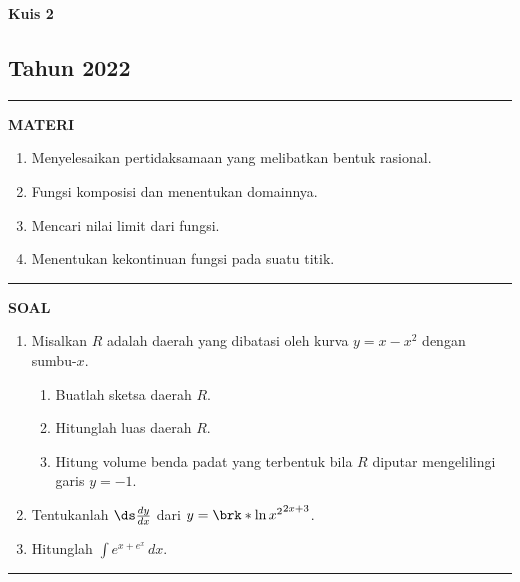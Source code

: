 \begin{flushright}
    \textbf{\Large{Kuis 2}}
    \subsection*{Tahun 2022}
\end{flushright}
\vspace{0.5cm}
\hrule height 2pt
\vspace{0.5cm}
\begin{center}
    \textbf{\large{MATERI}}
    \begin{enumerate}[leftmargin=*, label={\arabic*}.]
        \item Menyelesaikan pertidaksamaan yang melibatkan bentuk rasional.
        \item Fungsi komposisi dan menentukan domainnya.
        \item Mencari nilai limit dari fungsi.
        \item Menentukan kekontinuan fungsi pada suatu titik.
    \end{enumerate}
\end{center}
\vspace{0.2cm}
\hrule height 1pt
\vspace{0.5cm}
\begin{center}
    \textbf{\large{SOAL}}
\end{center}
\begin{enumerate}[leftmargin=*, label={\arabic*}.]
\item Misalkan $R$ adalah daerah yang dibatasi oleh kurva $y=x-x^{2}$ 
dengan sumbu-$x$.
\begin{enumerate}[label={\alph*}.]
    \item Buatlah sketsa daerah $R$.
    \item Hitunglah luas daerah $R$.
    \item Hitung volume benda padat yang terbentuk bila $R$ diputar 
    mengelilingi garis $y=-1$.
\end{enumerate}
\item Tentukanlah $\ds \frac{dy}{dx}$ dari $y=\brk*{\ln x^{2}}^{2x+3}$.
\item Hitunglah $\int e^{x+e^{x}}\,dx$.
\end{enumerate}
\vspace{0.2cm}
\hrule height 1pt
\vspace{0.5cm}

